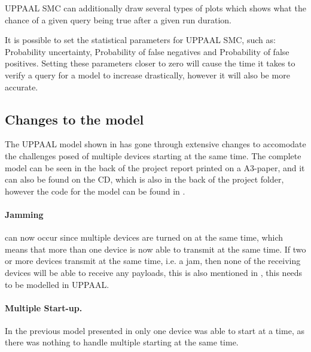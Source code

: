 UPPAAL SMC can additionally draw several types of plots which shows what the chance of a given query being true after a given run duration.

It is possible to set the statistical parameters for UPPAAL SMC, such as: Probability uncertainty, Probability of false negatives and Probability of false positives. 
Setting these parameters closer to zero will cause the time it takes to verify a query for a model to increase drastically, however it will also be more accurate. 


\subsection*{Changes to the model}

The UPPAAL model shown in  has gone through extensive changes to accomodate the challenges posed of multiple devices starting at the same time.
The complete model can be seen in the back of the project report printed on a A3-paper, and it can also be found on the CD, which is also in the back of the project folder, however the code for the model can be found in .


\paragraph{Jamming} can now occur since multiple devices are turned on at the same time, which means that more than one device is now able to transmit at the same time.
If two or more devices transmit at the same time, i.e. a jam, then none of the receiving devices will be able to receive any payloads, this is also mentioned in , this needs to be modelled in UPPAAL. 

\paragraph{Multiple Start-up.}
In the previous model presented in  only one device was able to start at a time, as there was nothing to handle multiple starting at the same time.

